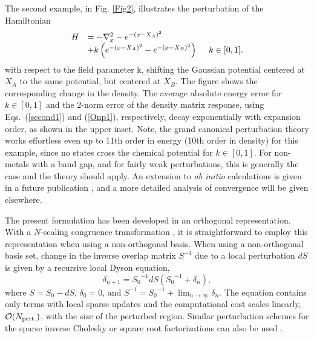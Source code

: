 The second example, in Fig. \ref{Fig2}, illustrates the perturbation of the
Hamiltonian 
\begin{equation}\label{HPRT}
\begin{array}{ll}
\displaystyle H &= -\nabla^2_x - e^{-(x-X_A)^2}\\
\displaystyle & +k \left( e^{-(x-X_A)^2} - e^{-(x-X_B)^2} \right) ~~~~ k \in [0,1].
\end{array}
\end{equation}
with respect to the field 
parameter k, shifting the Gaussian potential centered at $X_A$ to 
the same potential, but centered at $X_B$. The figure shows
the corresponding change in the density.  The average absolute energy
error for $k\in[0,1]$ and the 2-norm error of the density
matrix response, using Eqs.\ (\ref{second1}) and (\ref{Onp1}), respectively, 
decay exponentially with expansion order, as shown in the upper inset. Note, 
the grand canonical perturbation theory works effortless even up to 11th order
in energy (10th order in density) for this example, since no
states cross the chemical potential for $k \in [0,1]$. For
non-metals with a band gap, and for fairly weak perturbations, 
this is generally the case and the theory should apply.
An extension to {\it ab initio} calculations is given in a future
publication \cite{Weber04}, and a more detailed analysis of 
convergence will be given elsewhere.

The present formulation has been developed in an orthogonal representation.  With 
a $N$-scaling congruence transformation \cite{Benzi96,Challa99},  it is straightforward to 
employ this representation when using a non-orthogonal basis. When using a 
non-orthogonal basis set, change in the inverse overlap matrix  $S^{-1}$  due to
a local perturbation $dS$ is given by a recursive local Dyson equation, 
\begin{equation}
\delta_{n+1} = {S_{0}}^{-1} dS ({S_{0}}^{-1} + \delta_n),
\end{equation}
where $S = S_{0} - dS$, $\delta_{0} = 0$, and
$S^{-1} = {S_{0}}^{-1}+\lim_{n \rightarrow \infty} \delta_n$.
The equation contains only terms with local sparse updates 
and the computational cost scales linearly, ${\cal O}(N_{\rm pert.})$,
with the size of the perturbed region. Similar perturbation schemes 
for the sparse inverse Cholesky or square root factorizations can also 
be used \cite{unpubl}.

